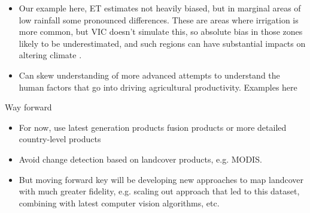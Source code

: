 \documentclass{pnastwo}
\begin{document}
\begin{article}
\begin{itemize}
  \begin{itemize}
     \item Our example here, ET estimates not heavily biased, but in marginal areas of low rainfall some pronounced differences. These are areas where irrigation is more common, but VIC doesn't simulate this, so absolute bias in those zones likely to be underestimated, and such regions can have substantial impacts on altering climate \cite{estes_changing_2014, sacks_effects_2008}. 
    \item Can skew understanding of more advanced attempts to understand the human factors that go into driving agricultural productivity. Examples here
    \end{itemize}
\end{itemize}


Way forward
\begin{itemize}
  \item For now, use latest generation products fusion products or more detailed country-level products
  \item Avoid change detection based on landcover products, e.g. MODIS. 
  \item But moving forward key will be developing new approaches to map landcover with much greater fidelity, e.g. scaling out approach that led to this dataset, combining with latest computer vision algorithms, etc.  
\end{itemize} 





\end{article}
\end{document}
